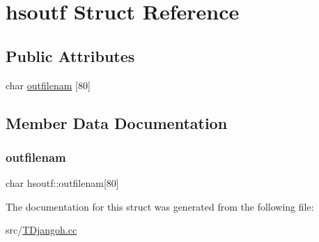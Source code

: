 \hypertarget{structhsoutf}{}\section{hsoutf Struct Reference}
\label{structhsoutf}
\subsection*{Public Attributes}
\begin{DoxyCompactItemize}
\item 
char \hyperlink{structhsoutf_a0bfb07132f9ec43bf5b5a0b46c00a75f}{outfilenam} \mbox{[}80\mbox{]}
\end{DoxyCompactItemize}


\subsection{Member Data Documentation}
\mbox{\label{structhsoutf_a0bfb07132f9ec43bf5b5a0b46c00a75f}} 
\subsubsection{\texorpdfstring{outfilenam}{outfilenam}}
{\footnotesize\ttfamily char hsoutf\+::outfilenam\mbox{[}80\mbox{]}}



The documentation for this struct was generated from the following file\+:\begin{DoxyCompactItemize}
\item 
src/\hyperlink{_t_djangoh_8cc}{T\+Djangoh.\+cc}\end{DoxyCompactItemize}
